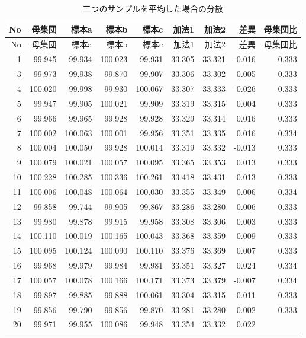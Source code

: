 \documentclass[]{tufte-handout}
\begin{document}
\begin{longtable}[]{@{}rrrrrrrrr@{}}
\caption{三つのサンプルを平均した場合の分散}\tabularnewline
\toprule
No & 母集団 & 標本a & 標本b & 標本c & 加法1 & 加法2 & 差異 & 母集団比 \\
\midrule
\endfirsthead
\toprule
No & 母集団 & 標本a & 標本b & 標本c & 加法1 & 加法2 & 差異 & 母集団比 \\
\midrule
\endhead
1 & 99.945 & 99.934 & 100.023 & 99.931 & 33.305 & 33.321 & -0.016 &
0.333 \\
3 & 99.973 & 99.938 & 99.870 & 99.907 & 33.306 & 33.302 & 0.005 &
0.333 \\
4 & 100.020 & 99.998 & 99.930 & 100.067 & 33.307 & 33.333 & -0.026 &
0.333 \\
5 & 99.947 & 99.905 & 100.021 & 99.909 & 33.319 & 33.315 & 0.004 &
0.333 \\
6 & 99.966 & 99.965 & 99.928 & 99.928 & 33.329 & 33.314 & 0.016 &
0.333 \\
7 & 100.002 & 100.063 & 100.001 & 99.956 & 33.351 & 33.335 & 0.016 &
0.334 \\
8 & 100.004 & 100.050 & 99.928 & 100.014 & 33.319 & 33.332 & -0.013 &
0.333 \\
9 & 100.079 & 100.021 & 100.057 & 100.095 & 33.365 & 33.353 & 0.013 &
0.333 \\
10 & 100.228 & 100.285 & 100.336 & 100.261 & 33.418 & 33.431 & -0.013 &
0.333 \\
11 & 100.006 & 100.048 & 100.064 & 100.030 & 33.355 & 33.349 & 0.006 &
0.334 \\
12 & 99.858 & 99.744 & 99.905 & 99.867 & 33.286 & 33.280 & 0.006 &
0.333 \\
13 & 99.980 & 99.878 & 99.915 & 99.958 & 33.308 & 33.306 & 0.003 &
0.333 \\
14 & 100.110 & 100.019 & 100.165 & 100.043 & 33.368 & 33.359 & 0.009 &
0.333 \\
15 & 100.095 & 100.124 & 100.090 & 100.110 & 33.376 & 33.369 & 0.007 &
0.333 \\
16 & 99.968 & 99.979 & 99.984 & 99.981 & 33.351 & 33.327 & 0.024 &
0.334 \\
17 & 100.057 & 100.078 & 100.166 & 100.171 & 33.373 & 33.379 & -0.007 &
0.334 \\
18 & 99.897 & 99.885 & 99.888 & 100.061 & 33.304 & 33.315 & -0.011 &
0.333 \\
19 & 99.856 & 99.790 & 99.856 & 99.870 & 33.281 & 33.280 & 0.002 &
0.333 \\
20 & 99.971 & 99.955 & 100.086 & 99.948 & 33.354 & 33.332 & 0.022 &

\end{longtable}
\end{document}
